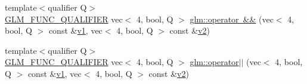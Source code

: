 \begin{DoxyCompactItemize}
\item 
{\footnotesize template$<$qualifier Q$>$ }\\\mbox{\hyperlink{setup_8hpp_a33fdea6f91c5f834105f7415e2a64407}{G\+L\+M\+\_\+\+F\+U\+N\+C\+\_\+\+Q\+U\+A\+L\+I\+F\+I\+ER}} vec$<$ 4, bool, Q $>$ \mbox{\hyperlink{namespaceglm_afacfec48da904c23397646cbba20c46b}{glm\+::operator \&\&}} (vec$<$ 4, bool, Q $>$ const \&\mbox{\hyperlink{_s_d_l__opengl__glext_8h_a435c176a02c061b43e19bdf7c86cceae}{v1}}, vec$<$ 4, bool, Q $>$ const \&\mbox{\hyperlink{_s_d_l__opengl__glext_8h_a0928f6d0f0f794ba000a21dfae422136}{v2}})
\item 
{\footnotesize template$<$qualifier Q$>$ }\\\mbox{\hyperlink{setup_8hpp_a33fdea6f91c5f834105f7415e2a64407}{G\+L\+M\+\_\+\+F\+U\+N\+C\+\_\+\+Q\+U\+A\+L\+I\+F\+I\+ER}} vec$<$ 4, bool, Q $>$ \mbox{\hyperlink{namespaceglm_a49d611996a3a372d8f7702708ca0e1e1}{glm\+::operator$\vert$$\vert$}} (vec$<$ 4, bool, Q $>$ const \&\mbox{\hyperlink{_s_d_l__opengl__glext_8h_a435c176a02c061b43e19bdf7c86cceae}{v1}}, vec$<$ 4, bool, Q $>$ const \&\mbox{\hyperlink{_s_d_l__opengl__glext_8h_a0928f6d0f0f794ba000a21dfae422136}{v2}})
\end{DoxyCompactItemize}
